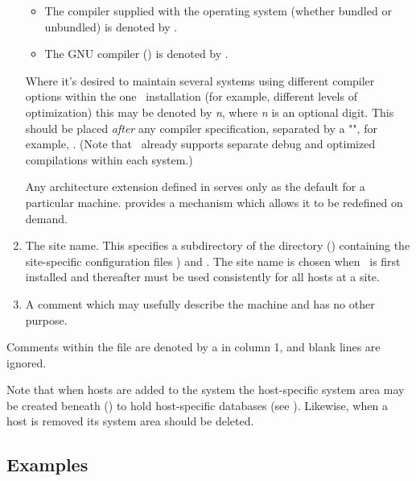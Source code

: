 \begin{enumerate}
   \begin{itemize}
   \item
      The compiler supplied with the operating system (whether bundled or
      unbundled) is denoted by .

   \item
      The GNU compiler () is denoted by .

   \end{itemize}

   Where it's desired to maintain several systems using different compiler
   options within the one \aipspp\ installation (for example, different
   levels of optimization) this may be denoted by \textit{n}, where
   \textit{n} is an optional digit.  This should be placed {\em after} any
   compiler specification, separated by a "\code{-}", for example,
   .  (Note that \aipspp\ already supports separate
   debug and optimized compilations within each system.)

   Any architecture extension defined in  serves only as the
   default for a particular machine.   provides a mechanism
   which allows it to be redefined on demand.

\item
   The site name.  This specifies a subdirectory of the 
   directory () containing the site-specific configuration
   files ) and .  The site name is chosen when
   \aipspp\ is first installed and thereafter must be used consistently for
   all hosts at a site.

\item
   A comment which may usefully describe the machine and has no other purpose.

\end{enumerate}

\noindent
Comments within the  file are denoted by a \code{\#} in column
1, and blank lines are ignored.

Note that when hosts are added to the system the host-specific system area
may be created beneath  () to hold
host-specific databases (see ).  Likewise, when a host is
removed its system area should be deleted.

\subsection*{Examples}

